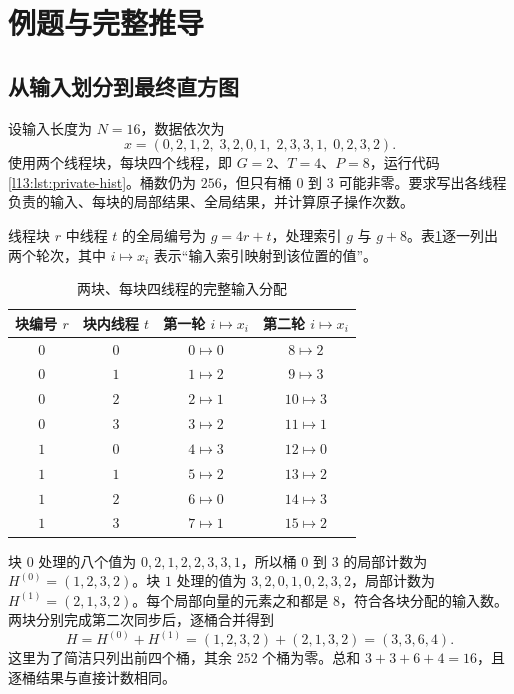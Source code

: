 \section{例题与完整推导}
\label{l13:sec:examples}

\subsection{从输入划分到最终直方图}

设输入长度为 $N=16$，数据依次为
\begin{equation*}
x=(0,2,1,2,\;3,2,0,1,\;2,3,3,1,\;0,2,3,2).
\end{equation*}
使用两个线程块，每块四个线程，即 $G=2$、$T=4$、$P=8$，运行代码\ref{l13:lst:private-hist}。桶数仍为 $256$，但只有桶 $0$ 到 $3$ 可能非零。要求写出各线程负责的输入、每块的局部结果、全局结果，并计算原子操作次数。

线程块 $r$ 中线程 $t$ 的全局编号为 $g=4r+t$，处理索引 $g$ 与 $g+8$。表\ref{l13:tab:worked-mapping}逐一列出两个轮次，其中 $i\mapsto x_i$ 表示“输入索引映射到该位置的值”。

\begin{table}[htbp]
\centering
\caption{两块、每块四线程的完整输入分配}
\label{l13:tab:worked-mapping}
\begin{tabular}{cccc}
\toprule
块编号 $r$ & 块内线程 $t$ & 第一轮 $i\mapsto x_i$ & 第二轮 $i\mapsto x_i$ \\
\midrule
$0$ & $0$ & $0\mapsto0$ & $8\mapsto2$ \\
$0$ & $1$ & $1\mapsto2$ & $9\mapsto3$ \\
$0$ & $2$ & $2\mapsto1$ & $10\mapsto3$ \\
$0$ & $3$ & $3\mapsto2$ & $11\mapsto1$ \\
\midrule
$1$ & $0$ & $4\mapsto3$ & $12\mapsto0$ \\
$1$ & $1$ & $5\mapsto2$ & $13\mapsto2$ \\
$1$ & $2$ & $6\mapsto0$ & $14\mapsto3$ \\
$1$ & $3$ & $7\mapsto1$ & $15\mapsto2$ \\
\bottomrule
\end{tabular}
\end{table}

块 $0$ 处理的八个值为 $0,2,1,2,2,3,3,1$，所以桶 $0$ 到 $3$ 的局部计数为 $H^{(0)}=(1,2,3,2)$。块 $1$ 处理的值为 $3,2,0,1,0,2,3,2$，局部计数为 $H^{(1)}=(2,1,3,2)$。每个局部向量的元素之和都是 $8$，符合各块分配的输入数。两块分别完成第二次同步后，逐桶合并得到
\begin{equation}
H=H^{(0)}+H^{(1)}
=(1,2,3,2)+(2,1,3,2)
=(3,3,6,4).
\label{l13:eq:worked-hist}
\end{equation}
这里为了简洁只列出前四个桶，其余 $252$ 个桶为零。总和 $3+3+6+4=16$，且逐桶结果与直接计数相同。

